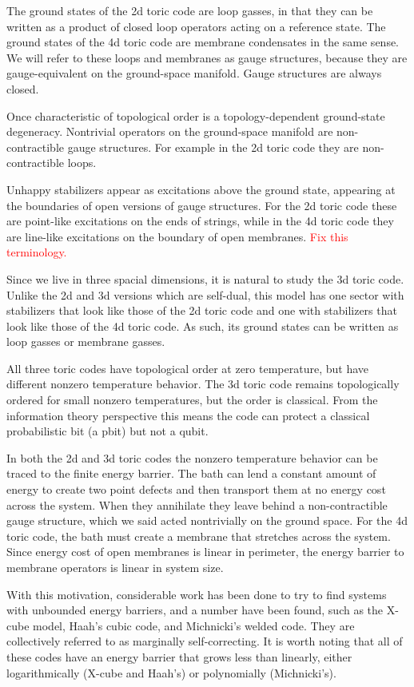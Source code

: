 \documentclass[twocolumn, longbibliography]{revtex4-2}
\newcommand{\note}[1]{\textcolor{red}{#1}}
\begin{document}
The ground states of the 2d toric code are loop gasses, in that they can be written as a product of closed loop operators acting on a reference state. The ground states of the 4d toric code are membrane condensates in the same sense. We will refer to these loops and membranes as gauge structures, because they are gauge-equivalent on the ground-space manifold. Gauge structures are always closed.
	
Once characteristic of topological order is a topology-dependent ground-state degeneracy. Nontrivial operators on the ground-space manifold are non-contractible gauge structures. For example in the 2d toric code they are non-contractible loops. 
	
Unhappy stabilizers appear as excitations above the ground state, appearing at the boundaries of open versions of gauge structures. For the 2d toric code these are point-like excitations on the ends of strings, while in the 4d toric code they are line-like excitations on the boundary of open membranes. \note{Fix this terminology.}
	
Since we live in three spacial dimensions, it is natural to study the 3d toric code. Unlike the 2d and 3d versions which are self-dual, this model has one sector with stabilizers that look like those of the 2d toric code and one with stabilizers that look like those of the 4d toric code. As such, its ground states can be written as loop gasses or membrane gasses.
	
All three toric codes have topological order at zero temperature, but have different nonzero temperature behavior. The 3d toric code remains topologically ordered for small nonzero temperatures, but the order is classical. From the information theory perspective this means the code can protect a classical probabilistic bit (a pbit) but not a qubit. 
	
In both the 2d and 3d toric codes the nonzero temperature behavior can be traced to the finite energy barrier. The bath can lend a constant amount of energy to create two point defects and then transport them at no energy cost across the system. When they annihilate they leave behind a non-contractible gauge structure, which we said acted nontrivially on the ground space. For the 4d toric code, the bath must create a membrane that stretches across the system. Since energy cost of open membranes is linear in perimeter, the energy barrier to membrane operators is linear in system size.
	
With this motivation, considerable work has been done to try to find systems with unbounded energy barriers, and a number have been found, such as the X-cube model, Haah's cubic code, and Michnicki's welded code. They are collectively referred to as marginally self-correcting. It is worth noting that all of these codes have an energy barrier that grows less than linearly, either logarithmically (X-cube and Haah's) or polynomially (Michnicki's).
	
\end{document}
